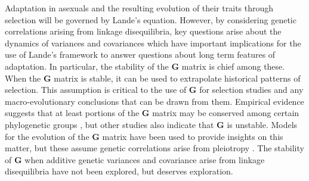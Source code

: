 \documentclass[11pt,twocolumn]{article}
\newcommand{\G}{\textbf{G }}
\begin{document}
Adaptation in asexuals and the resulting evolution of their traits through selection will be governed by Lande’s equation. However, by considering genetic correlations arising from linkage disequilibria, key questions arise about the dynamics of variances and covariances which have important implications for the use of Lande's framework to answer questions about long term features of adaptation. In particular, the stability of the \G matrix is chief among these. When the \G matrix is stable, it can be used to extrapolate historical patterns of selection. This assumption is critical to the use of \G for selection studies and any macro-evolutionary conclusions that can be drawn from them. Empirical evidence suggests that at least portions of the \G matrix may be conserved among certain phylogenetic groups \citep{Arnold1999,Roff2000,Steppan2002}, but other studies also indicate that \G is unstable. Models for the evolution of the \G matrix have been used to provide insights on this matter, but these assume genetic correlations arise from pleiotropy \citep{Turelli1988}. The stability of \G when additive genetic variances and covariance arise from linkage disequilibria have not been explored, but deserves exploration. 
\end{document}

